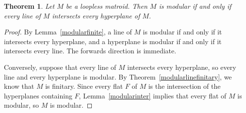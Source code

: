 \documentclass{amsart}
\theoremstyle{plain}
\newtheorem{theorem}{Theorem}[section]
\newtheorem{lemma}[theorem]{Lemma}
\theoremstyle{definition}
\newcommand{\cF}{\mathcal{F}}
\newcommand{\cL}{\mathcal{L}}
\newcommand{\cX}{\mathcal{X}}
\newcommand{\con}{/}
\renewcommand{\ss}{\subseteq}
\newcommand{\gutsproj}[3]{\mathsf{g}_{#2}^{#3}(#1)}
\begin{document}
\begin{theorem}
  Let $M$ be a loopless matroid. Then $M$ is modular if and only if every line of $M$
  intersects every hyperplane of $M$. 
\end{theorem}
\begin{proof}
  By Lemma~\ref{modularfinite},
  a line of $M$ is modular if and only if it intersects 
  every hyperplane, and a hyperplane is modular if and only if it intersects every line. 
  The forwards direction is immediate. 

  Conversely, suppose that every line of $M$ intersects every hyperplane,
  so every line and every hyperplane is modular. 
  By Theorem~\ref{modularlinefinitary}, we know that $M$ is finitary.
  Since every flat $F$ of $M$ is the intersection of the hyperplanes containing $F$, 
  Lemma~\ref{modularinter} implies that every flat of $M$ is modular, so $M$ is modular. 
\end{proof}




\end{document}
